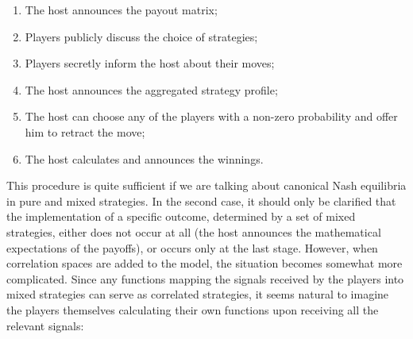 \begin{enumerate}
	\item The host announces the payout matrix; %
	\item Players publicly discuss the choice of strategies; %
	\item Players secretly inform the host about their moves; %
	\item The host announces the aggregated strategy profile; %
	\item The host can choose any of the players with a non-zero probability and offer him to retract the move; %
	\item The host calculates and announces the winnings. %
\end{enumerate}

This procedure is quite sufficient if we are talking about canonical Nash equilibria in pure and mixed strategies. In the second case, it should only be clarified that the implementation of a specific outcome, determined by a set of mixed strategies, either does not occur at all (the host announces the mathematical expectations of the payoffs), or occurs only at the last stage. However, when correlation spaces are added to the model, the situation becomes somewhat more complicated. Since any functions mapping the signals received by the players into mixed strategies can serve as correlated strategies, it seems natural to imagine the players themselves calculating their own functions upon receiving all the relevant signals: %

